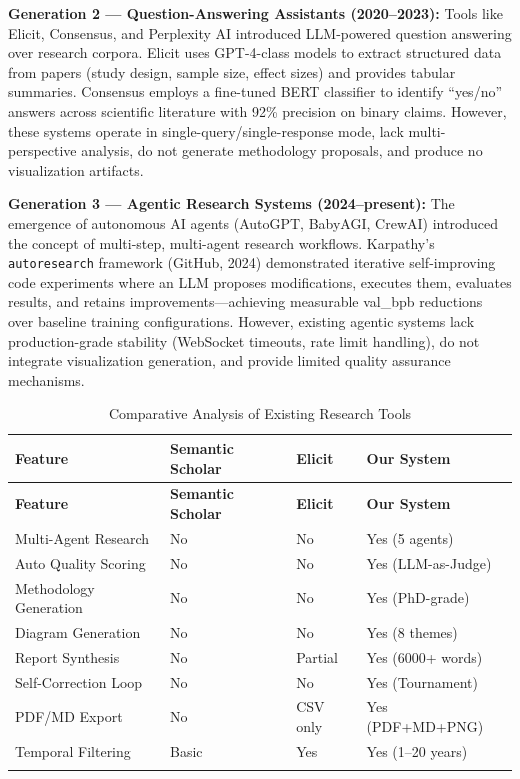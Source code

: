 \documentclass[a4paper,12pt,openany]{report}
\begin{document}
\textbf{Generation 2 --- Question-Answering Assistants (2020--2023):} Tools like Elicit, Consensus, and Perplexity AI introduced LLM-powered question answering over research corpora. Elicit uses GPT-4-class models to extract structured data from papers (study design, sample size, effect sizes) and provides tabular summaries. Consensus employs a fine-tuned BERT classifier to identify ``yes/no'' answers across scientific literature with 92\% precision on binary claims. However, these systems operate in single-query/single-response mode, lack multi-perspective analysis, do not generate methodology proposals, and produce no visualization artifacts.

\textbf{Generation 3 --- Agentic Research Systems (2024--present):} The emergence of autonomous AI agents (AutoGPT, BabyAGI, CrewAI) introduced the concept of multi-step, multi-agent research workflows. Karpathy's \texttt{autoresearch} framework (GitHub, 2024) demonstrated iterative self-improving code experiments where an LLM proposes modifications, executes them, evaluates results, and retains improvements---achieving measurable val\_bpb reductions over baseline training configurations. However, existing agentic systems lack production-grade stability (WebSocket timeouts, rate limit handling), do not integrate visualization generation, and provide limited quality assurance mechanisms.

\begin{longtable}{|p{2.8cm}|p{3cm}|p{3cm}|p{3.5cm}|}
\hline
\textbf{Feature} & \textbf{Semantic Scholar} & \textbf{Elicit} & \textbf{Our System} \\
\hline
\endfirsthead
\hline
\textbf{Feature} & \textbf{Semantic Scholar} & \textbf{Elicit} & \textbf{Our System} \\
\hline
\endhead
\hline
\endfoot
Multi-Agent Research & No & No & Yes (5 agents) \\
\hline
Auto Quality Scoring & No & No & Yes (LLM-as-Judge) \\
\hline
Methodology Generation & No & No & Yes (PhD-grade) \\
\hline
Diagram Generation & No & No & Yes (8 themes) \\
\hline
Report Synthesis & No & Partial & Yes (6000+ words) \\
\hline
Self-Correction Loop & No & No & Yes (Tournament) \\
\hline
PDF/MD Export & No & CSV only & Yes (PDF+MD+PNG) \\
\hline
Temporal Filtering & Basic & Yes & Yes (1--20 years) \\
\hline

\caption{Comparative Analysis of Existing Research Tools}
\label{tab:existing_systems}
\end{longtable}
\end{document}
